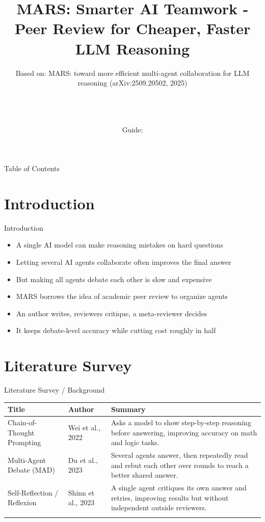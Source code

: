 \documentclass[10pt]{beamer}
\title[B.Tech Seminar]{MARS: Smarter AI Teamwork - Peer Review for Cheaper, Faster LLM Reasoning}
\subtitle{Based on: MARS: toward more efficient multi-agent collaboration for LLM reasoning (arXiv:2509.20502, 2025)}
\author[\studentname\ (\shortinst)]{\studentname \\ \small \rollno \\ \small \rollclass \\ \small Guide: \guidename}
\institute[]{\deptname \\ \collegename}
\date{\seminardate}
\begin{document}
\begin{frame}[plain]
  \titlepage
\end{frame}
\begin{frame}{Table of Contents}
  \tableofcontents
\end{frame}
\section{Introduction}
\begin{frame}{Introduction}
\begin{itemize}
  \item A single AI model can make reasoning mistakes on hard questions
  \item Letting several AI agents collaborate often improves the final answer
  \item But making all agents debate each other is slow and expensive
  \item MARS borrows the idea of academic peer review to organize agents
  \item An author writes, reviewers critique, a meta-reviewer decides
  \item It keeps debate-level accuracy while cutting cost roughly in half
\end{itemize}
\end{frame}
\section{Literature Survey}
\begin{frame}{Literature Survey / Background}
  \small
  \begin{tabular}{@{}p{2.7cm}p{2.3cm}p{5.6cm}@{}}
    \toprule
    \textbf{Title} & \textbf{Author} & \textbf{Summary} \\
    \midrule
    Chain-of-Thought Prompting & Wei et al., 2022 & Asks a model to show step-by-step reasoning before answering, improving accuracy on math and logic tasks. \\
    \addlinespace
    Multi-Agent Debate (MAD) & Du et al., 2023 & Several agents answer, then repeatedly read and rebut each other over rounds to reach a better shared answer. \\
    \addlinespace
    Self-Reflection / Reflexion & Shinn et al., 2023 & A single agent critiques its own answer and retries, improving results but without independent outside reviewers. \\
    \addlinespace
    \bottomrule
  \end{tabular}
\end{frame}
\end{document}
